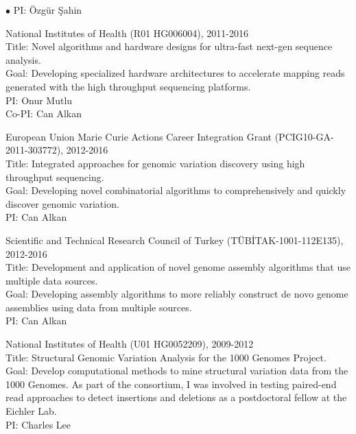 \documentclass[margin,line]{res}
\newenvironment{list2}{
  \begin{list}{$\bullet$}{%
      \setlength{\itemsep}{0in}
      \setlength{\parsep}{0in} \setlength{\parskip}{0in}
      \setlength{\topsep}{0in} \setlength{\partopsep}{0in} 
      \setlength{\leftmargin}{0.2in}}}{\end{list}}
\begin{document}
\begin{resume}
\begin{list2}
                                         PI: Özgür Şahin
                                       \item
                                         National Institutes of Health (R01 HG006004), 2011-2016\\
                                         Title: Novel algorithms and hardware designs for ultra-fast next-gen sequence analysis.\\
                                         Goal: Developing specialized hardware architectures to accelerate mapping reads generated with the high throughput sequencing platforms.\\
                                         PI: Onur Mutlu\\
                                         Co-PI: Can Alkan
                                         \clearpage
                                       \item
                                         European Union Marie Curie Actions Career Integration Grant (PCIG10-GA-2011-303772),  2012-2016\\
                                         Title: Integrated approaches for genomic variation discovery using high throughput sequencing.\\
                                         Goal: Developing novel combinatorial algorithms to comprehensively and quickly discover genomic variation.\\
                                         PI: Can Alkan

                                       \item
                                         Scientific and Technical Research Council of Turkey (T\"{U}B\.{I}TAK-1001-112E135), 2012-2016\\
                                         Title: Development and application of novel genome assembly algorithms that use multiple data sources.\\
                                         Goal: Developing assembly algorithms to more reliably construct de novo genome assemblies using data from multiple sources.\\
                                         PI: Can Alkan
                                       \item
                                         National Institutes of Health (U01 HG0052209), 2009-2012\\
                                         Title: Structural Genomic Variation Analysis for the 1000 Genomes Project.\\
                                         Goal: Develop computational methods to mine structural variation data from the 1000 Genomes.
                                         As part of the consortium, I was involved in testing paired-end read approaches to detect insertions and deletions as a postdoctoral fellow at the Eichler Lab.\\
                                         PI: Charles Lee
                                       \end{list2}



\end{resume}
\end{document}
